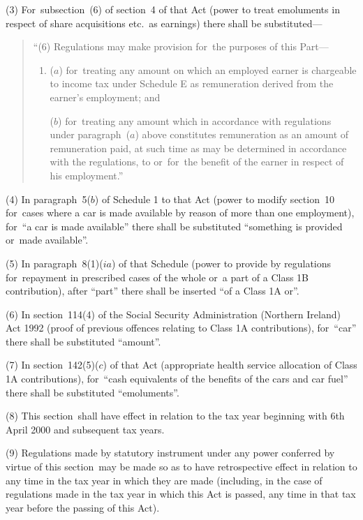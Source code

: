 \documentclass[12pt,a4paper]{article}
\begin{document}
(3) For~subsection~(6)  of section~4 of that Act (power to treat emoluments in respect of share acquisitions etc.\ as earnings) there shall be substituted—
\begin{quotation}
“(6) Regulations may make provision for~the purposes of this Part—
\begin{enumerate}\item[]
($a$) for~treating any amount on which an employed earner is chargeable to income tax under Schedule E as remuneration derived from the earner’s employment; and

($b$) for~treating any amount which in accordance with regulations under paragraph~($a$)  above constitutes remuneration as an amount of remuneration paid, at such time as may be determined in accordance with the regulations, to or~for~the benefit of the earner in respect of his employment.”
\end{enumerate}
\end{quotation}

(4) In paragraph~5($b$)  of Schedule 1 to that Act (power to modify section~10 for~cases where a car is made available by reason of more than one employment), for~“a car is made available” there shall be substituted “something is provided or~made available”.

(5) In paragraph~8(1)($ia$) of that Schedule (power to provide by regulations for~repayment in prescribed cases of the whole or~a part of a Class 1B contribution), after “part” there shall be inserted “of a Class 1A or”.

(6) In section~114(4)  of the Social Security Administration (Northern Ireland) Act 1992 (proof of previous offences relating to Class 1A contributions), for~“car” there shall be substituted “amount”.

(7) In section~142(5)($c$)  of that Act (appropriate health service allocation of Class 1A contributions), for~“cash equivalents of the benefits of the cars and car fuel” there shall be substituted “emoluments”.

(8) This section~shall have effect in relation to the tax year beginning with 6th April 2000 and subsequent tax years.

(9) Regulations made by statutory instrument under any power conferred by virtue of this section~may be made so as to have retrospective effect in relation to any time in the tax year in which they are made (including, in the case of regulations made in the tax year in which this Act is passed, any time in that tax year before the passing of this Act).
\end{document}
